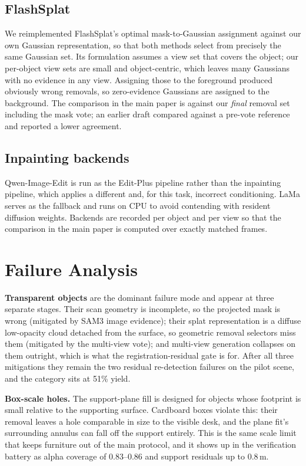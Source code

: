 \subsection{FlashSplat}
We reimplemented FlashSplat's optimal mask-to-Gaussian assignment against
our own Gaussian representation, so that both methods select from
precisely the same Gaussian set. Its formulation assumes a view set that
covers the object; our per-object view sets are small and object-centric,
which leaves many Gaussians with no evidence in any view. Assigning those
to the foreground produced obviously wrong removals, so zero-evidence
Gaussians are assigned to the background. The comparison in the main paper
is against our \emph{final} removal set including the mask vote; an
earlier draft compared against a pre-vote reference and reported a lower
agreement.

\subsection{Inpainting backends}
Qwen-Image-Edit is run as the Edit-Plus pipeline rather than the
inpainting pipeline, which applies a different and, for this task,
incorrect conditioning. LaMa serves as the fallback and runs on CPU to
avoid contending with resident diffusion weights. Backends are recorded
per object and per view so that the comparison in the main paper is
computed over exactly matched frames.

\section{Failure Analysis}
\label{app:failures}

\textbf{Transparent objects} are the dominant failure mode and appear at
three separate stages. Their scan geometry is incomplete, so the projected
mask is wrong (mitigated by SAM3 image evidence); their splat
representation is a diffuse low-opacity cloud detached from the surface,
so geometric removal selectors miss them (mitigated by the multi-view
vote); and multi-view generation collapses on them outright, which is what
the registration-residual gate is for. After all three mitigations they
remain the two residual re-detection failures on the pilot scene, and the
category sits at 51\% yield.

\textbf{Box-scale holes.} The support-plane fill is designed for objects
whose footprint is small relative to the supporting surface. Cardboard
boxes violate this: their removal leaves a hole comparable in size to the
visible desk, and the plane fit's surrounding annulus can fall off the
support entirely. This is the same scale limit that keeps furniture out of
the main protocol, and it shows up in the verification battery as alpha
coverage of 0.83--0.86 and support residuals up to 0.8\,m.


